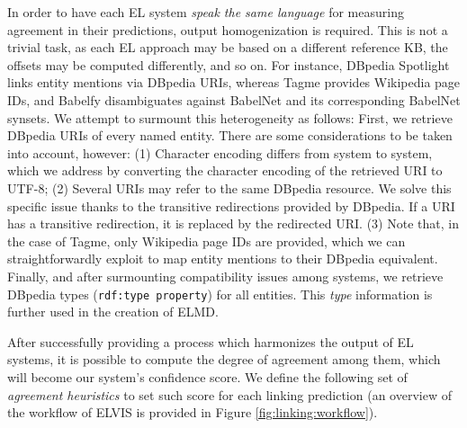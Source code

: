 In order to have each EL system \textit{speak the same language} for measuring agreement in their predictions, output homogenization is required. This is not a trivial task, as each EL approach may be based on a different reference KB, the offsets may be computed differently, and so on. For instance, DBpedia Spotlight links entity mentions via DBpedia URIs, whereas Tagme provides Wikipedia page IDs, and Babelfy disambiguates against BabelNet \cite{NavigliPonzetto2012} and its corresponding BabelNet synsets. 
We attempt to surmount this heterogeneity as follows: First, we retrieve DBpedia URIs of every named entity. There are some considerations to be taken into account, however: (1) Character encoding differs from system to system, which we address by converting the character encoding of the retrieved URI to \textsc{UTF-8}; (2) Several URIs may refer to the same DBpedia resource. We solve this specific issue thanks to the transitive redirections provided by DBpedia. If a URI has a transitive redirection, it is replaced by the redirected URI. (3) Note that, in the case of Tagme, only Wikipedia page IDs are provided, which we can straightforwardly exploit to map entity mentions to their DBpedia equivalent. Finally, and after surmounting compatibility issues among systems, we retrieve DBpedia types (\texttt{rdf:type property}) for all entities. This \textit{type} information is further used in the creation of \textsc{ELMD}.



After successfully providing a process which harmonizes the output of EL systems, it is possible to compute the degree of agreement among them, which will become our system's confidence score. We define the following set of \textit{agreement heuristics} to set such score for each linking prediction (an overview of the workflow of \textsc{ELVIS} is provided in Figure \ref{fig:linking:workflow}).


